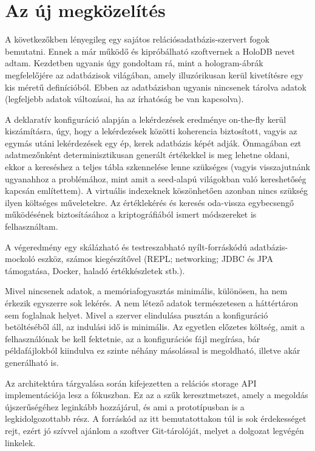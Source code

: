 \documentclass[
    parspace,
    noindent,
    nohyp,
]{elteiktdk}[2023/04/10]
\begin{document}
\section{Az új megközelítés}

A következőkben lényegileg egy sajátos relációsadatbázis-szervert fogok bemutatni.
Ennek a már működő és kipróbálható szoftvernek a HoloDB nevet adtam.
Kezdetben ugyanis úgy gondoltam rá,
mint a hologram-ábrák megfelelőjére az adatbázisok világában,
amely illuzórikusan kerül kivetítésre egy kis méretű definícióból.
Ebben az adatbázisban ugyanis nincsenek tárolva adatok
(legfeljebb adatok változásai, ha az írhatóság be van kapcsolva).

A deklaratív konfiguráció alapján a lekérdezések eredménye on-the-fly kerül kiszámításra,
úgy, hogy a lekérdezések közötti koherencia biztosított,
vagyis az egymás utáni lekérdezések egy ép, kerek adatbázis képét adják.
Önmagában ezt adatmezőnként determinisztikusan generált értékekkel is meg lehetne oldani,
ekkor a kereséshez a teljes tábla szkennelése lenne szükséges
(vagyis visszajutnánk ugyanahhoz a problémához,
mint amit a seed-alapú világokban való kereshetőség kapcsán említettem).
A virtuális indexeknek köszönhetően azonban nincs szükség ilyen költséges műveletekre.
Az értéklekérés és keresés oda-vissza egybecsengő működésének
biztosításához a kriptográfiából ismert módszereket is felhasználtam.

A végeredmény egy skálázható és testreszabható nyílt-forráskódú adatbázis-mockoló eszköz,
számos kiegészítővel
(REPL; networking; JDBC és JPA támogatása, Docker, haladó értékkészletek stb.).

Mivel nincsenek adatok, a memóriafogyasztás minimális,
különösen, ha nem érkezik egyszerre sok lekérés.
A nem létező adatok természetesen a háttértáron sem foglalnak helyet.
Mivel a szerver elindulása pusztán a konfiguráció betöltéséből áll,
az indulási idő is minimális.
Az egyetlen előzetes költség, amit a felhasználónak be kell fektetnie,
az a konfigurációs fájl megírása,
bár példafájlokból kiindulva ez szinte néhány másolással is megoldható,
illetve akár generálható is.

Az architektúra tárgyalása során kifejezetten a relációs storage API implementációja lesz a fókuszban.
Ez az a szűk keresztmetszet, amely a megoldás újszerűségéhez leginkább hozzájárul,
és ami a prototípusban is a legkidolgozottabb rész.
A forráskód az itt bemutatottakon túl is sok érdekességet rejt,
ezért jó szívvel ajánlom a szoftver Git-tárolóját,
melyet a dolgozat legvégén linkelek.
\end{document}
